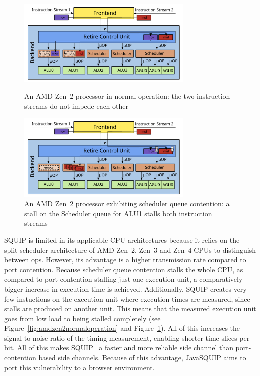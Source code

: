 \documentclass[11pt,
  titlepage=false,
]{scrreprt}
\begin{document}
\begin{figure}
    \centering
    \includegraphics[width=0.75\textwidth]{figures/Zen2 normal operation}

    \caption{An AMD Zen~2 processor in normal operation: the two instruction streams do not impede each other}
    \label{fig:amdzen2normaloperation}

    \includegraphics[width=0.75\textwidth]{figures/Zen2 sqc}

    \caption{An AMD Zen~2 processor exhibiting scheduler queue contention: a stall on the Scheduler queue for ALU1 stalls both instruction streams}
    \label{fig:amdzen2sqc}
\end{figure}

SQUIP is limited in its applicable CPU architectures because it relies on the split-scheduler architecture of AMD Zen~2, Zen~3 and Zen~4 CPUs to distinguish between \textmu ops.
However, its advantage is a higher transmission rate compared to port contention.
Because scheduler queue contention stalls the whole CPU, as compared to port contention stalling just one execution unit,
a comparatively bigger increase in execution time is achieved.
Additionally, SQUIP creates very few instuctions on the execution unit where execution times are measured,
since stalls are produced on another unit.
This means that the measured execution unit goes from low load to being stalled completely (see Figure~\ref{fig:amdzen2normaloperation} and Figure~\ref{fig:amdzen2sqc}).
All of this increases the signal-to-noise ratio of the timing measurement,
enabling shorter time slices per bit.
All of this makes SQUIP~\cite{squip} a faster and more reliable side channel than port-contention based side channels.
Because of this advantage, JavaSQUIP aims to port this vulnerability to a browser environment.
\end{document}
